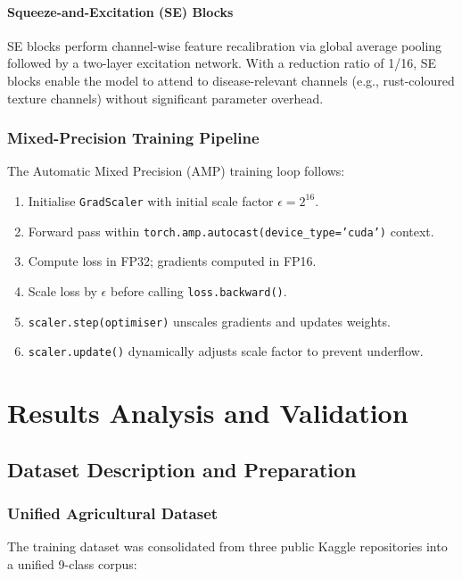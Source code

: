 \documentclass[12pt,oneside]{report}
\begin{document}
\subsubsection{Squeeze-and-Excitation (SE) Blocks}
SE blocks perform channel-wise feature recalibration via global average pooling followed by a two-layer excitation network. With a reduction ratio of 1/16, SE blocks enable the model to attend to disease-relevant channels (e.g., rust-coloured texture channels) without significant parameter overhead.

\subsection{Mixed-Precision Training Pipeline}

The Automatic Mixed Precision (AMP) training loop follows:
\begin{enumerate}
    \item Initialise \texttt{GradScaler} with initial scale factor $\epsilon = 2^{16}$.
    \item Forward pass within \texttt{torch.amp.autocast(device\_type='cuda')} context.
    \item Compute loss in FP32; gradients computed in FP16.
    \item Scale loss by $\epsilon$ before calling \texttt{loss.backward()}.
    \item \texttt{scaler.step(optimiser)} unscales gradients and updates weights.
    \item \texttt{scaler.update()} dynamically adjusts scale factor to prevent underflow.
\end{enumerate}

\chapter{Results Analysis and Validation}

\section{Dataset Description and Preparation}

\subsection{Unified Agricultural Dataset}
The training dataset was consolidated from three public Kaggle repositories into a unified 9-class corpus:
\end{document}
